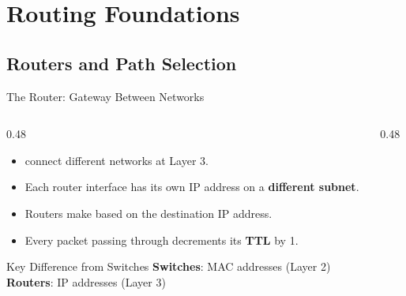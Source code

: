 \documentclass[aspectratio=169]{beamer}  %
\begin{document}
\section{Routing Foundations}
\subsection{Routers and Path Selection}


\begin{frame}{The Router: Gateway Between Networks}
    \begin{columns}[T]
        \begin{column}{0.48\textwidth}
            \begin{itemize}
                \item {} connect different networks at Layer 3.
                \item Each router interface has its own IP address on a \textbf{different subnet}.
                \item Routers make  based on the destination IP address.
                \item Every packet passing through decrements its \textbf{TTL} by 1.
            \end{itemize}
            
            \vspace{0.3em}
            \begin{alertblock}{Key Difference from Switches}
                \small
                \textbf{Switches}: MAC addresses (Layer 2) \\
                \textbf{Routers}: IP addresses (Layer 3)
            \end{alertblock}
        \end{column}
        \begin{column}{0.48\textwidth}
            \begin{center}
\end{center}
\end{column}
\end{columns}
\end{frame}
\end{document}
